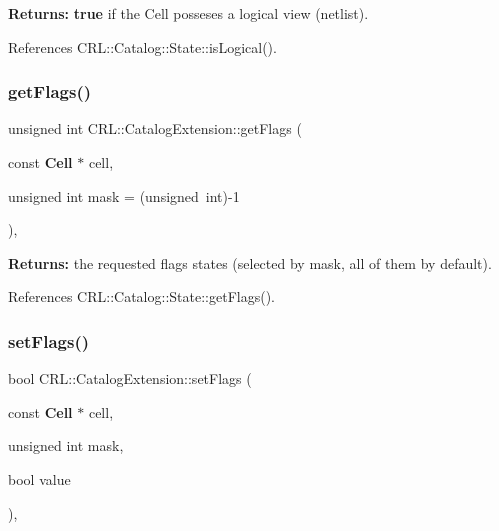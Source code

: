 {\bfseries Returns\+:} {\bfseries true} if the Cell posseses a logical view (netlist). 

References C\+R\+L\+::\+Catalog\+::\+State\+::is\+Logical().

\mbox{\label{classCRL_1_1CatalogExtension_a9525c2253aa310a63de32caaeb694e66}} 
\subsubsection{\texorpdfstring{get\+Flags()}{getFlags()}}
{\footnotesize\ttfamily unsigned int C\+R\+L\+::\+Catalog\+Extension\+::get\+Flags (\begin{DoxyParamCaption}\item[{const \textbf{ Cell} $\ast$}]{cell,  }\item[{unsigned int}]{mask = {\ttfamily (unsigned~int)-\/1} }\end{DoxyParamCaption})\hspace{0.3cm}{\ttfamily [inline]}, {\ttfamily [static]}}

{\bfseries Returns\+:} the requested flags states (selected by {\ttfamily mask}, all of them by default). 

References C\+R\+L\+::\+Catalog\+::\+State\+::get\+Flags().

\mbox{\label{classCRL_1_1CatalogExtension_ab9475735032d500f4d4a8cf980864b3e}} 
\subsubsection{\texorpdfstring{set\+Flags()}{setFlags()}}
{\footnotesize\ttfamily bool C\+R\+L\+::\+Catalog\+Extension\+::set\+Flags (\begin{DoxyParamCaption}\item[{const \textbf{ Cell} $\ast$}]{cell,  }\item[{unsigned int}]{mask,  }\item[{bool}]{value }\end{DoxyParamCaption})\hspace{0.3cm}{\ttfamily [inline]}, {\ttfamily [static]}}

